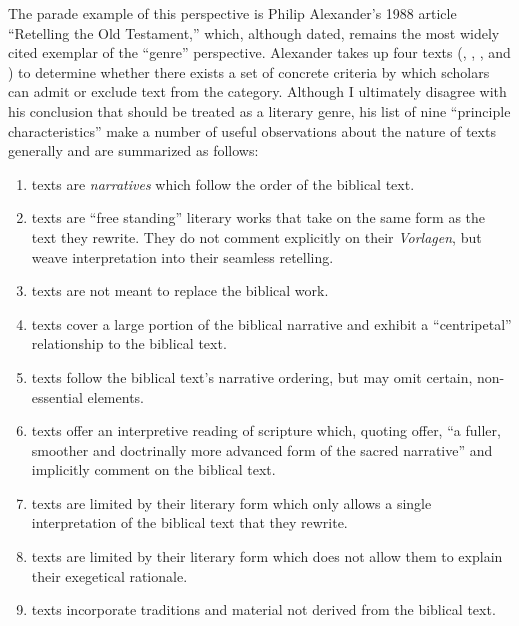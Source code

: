The parade example of this perspective is Philip Alexander's 1988
article ``Retelling the Old Testament,'' which, although dated, remains
the most widely cited exemplar of the ``genre''
perspective.\autocites{alexander_carson-williamson1988}[\vermes
himself even put his stamp of approval on it,
see][4]{vermes_zsengeller2014} Alexander takes up four
\rwB texts (\jub, \ga,
\lab, and \ant) to determine whether
there exists a set of concrete criteria by which scholars can admit or
exclude text from the category. Although I ultimately disagree with his
conclusion that \rwb should be treated as a literary
genre, his list of nine ``principle characteristics'' make a number of
useful observations about the nature of \rwb texts
generally and are summarized as follows:

\begin{enumerate}
\def\labelenumi{\arabic{enumi}.}
\tightlist
\item
  \rwb texts are \emph{narratives} which follow the
  order of the biblical text.
\item
  \rwb texts are ``free standing'' literary works that
  take on the same form as the text they rewrite. They do not comment
  explicitly on their \emph{Vorlagen}, but weave interpretation into
  their seamless retelling.
\item
  \rwb texts are not meant to replace the biblical work.
\item
  \rwb texts cover a large portion of the biblical
  narrative and exhibit a ``centripetal'' relationship to the biblical
  text.
\item
  \rwb texts follow the biblical text's narrative
  ordering, but may omit certain, non-essential elements.
\item
  \rwb texts offer an interpretive reading of scripture
  which, quoting \vermes offer, ``a fuller, smoother and
  doctrinally more advanced form of the sacred
  narrative''\autocite[Citing \vermes
  in][305]{schurer1986} and implicitly comment on the biblical text.
\item
  \rwb texts are limited by their literary form which
  only allows a single interpretation of the biblical text that they
  rewrite.
\item
  \rwb texts are limited by their literary form which
  does not allow them to explain their exegetical rationale.
\item
  \rwb texts incorporate traditions and material not
  derived from the biblical text.
\end{enumerate}

